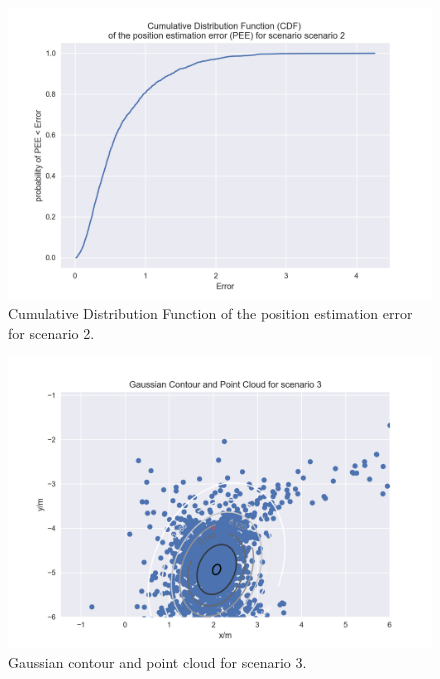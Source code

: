 \begin{figure}[H]
	\centering
\includegraphics[width=14cm]{cdf2.png}
	\caption{Cumulative Distribution Function of the position estimation error for scenario 2.}
	\label{fig1:cdf2}
\end{figure}

\begin{figure}[H]
	\centering
\includegraphics[width=14cm]{gauss3.png}
	\caption{Gaussian contour and point cloud for scenario 3.}
	\label{fig1:gpc3}
\end{figure}

